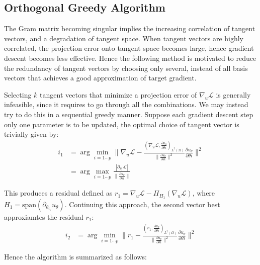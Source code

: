 \documentclass{article}
\begin{document}
\subsection{Orthogonal Greedy Algorithm}
The Gram matrix becoming singular implies the increasing correlation of tangent vectors, and a degradation of tangent space. When tangent vectors are highly correlated, the projection error onto tangent space becomes large, hence gradient descent becomes less effective. Hence the following method is motivated to reduce the redundancy of tangent vectors by choosing only several, instead of all basis vectors that achieves a good approximation of target gradient.

Selecting $k$ tangent vectors that minimize a projection error of $\nabla_u\mathcal{L}$ is generally infeasible, since it requires to go through all the combinations. We may instead try to do this in a sequential greedy manner. Suppose each gradient descent step only one parameter is to be updated, the optimal choice of tangent vector is trivially given by:
\begin{align}
    i_1&=\arg\min_{i=1\cdots p}\|\nabla_u \mathcal{L}-\frac{(\nabla_u \mathcal{L},\frac{\partial u_\theta}{\partial\theta i})_{L^2(\Omega)}}{\|\frac{\partial u_\theta}{\partial\theta i}\|^2}\frac{\partial u_\theta}{\partial\theta i}\|^2 \\
    &=\arg\max_{i=1\cdots p} \frac{|\partial_{\theta_i}\mathcal{L}|}{\|\frac{\partial u_\theta}{\partial\theta i}\|}
\end{align}

This produces a residual defined as $r_1=\nabla_u\mathcal{L}-\Pi_{H_1}(\nabla_u\mathcal{L})$, where $H_1=\text{span}(\partial_{\theta_{i_1}}u_{\theta})$. Continuing this approach, the second vector best approxiamtes the residual $r_1$:
\begin{align}
    i_2&=\arg\min_{i=1\cdots p}\|r_1-\frac{(r_1,\frac{\partial u_\theta}{\partial\theta i})_{L^2(\Omega)}}{\|\frac{\partial u_\theta}{\partial\theta i}\|^2}\frac{\partial u_\theta}{\partial\theta i}\|^2 
\end{align}

Hence the algorithm is summarized as follows:
\end{document}
